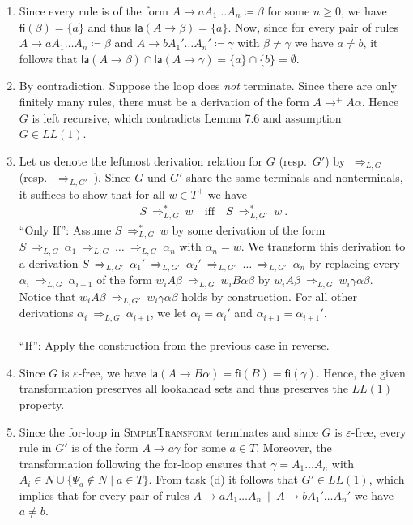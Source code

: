 \begin{solution}
	\begin{enumerate}
		\item Since every rule is of the form $A \rightarrow aA_1\ldots A_n \coloneqq \beta$ for some $n\geq 0$, we have $\textsf{fi}(\beta) = \{a\}$ and thus $\textsf{la}(A \rightarrow \beta) =\{a\}$. Now, since for every pair of rules $A \rightarrow a A_1 \dots A_n \coloneqq \beta$ and $A \rightarrow b A_1' \dots A_n' \coloneqq \gamma$ with $\beta \neq \gamma$ we have $a \neq b$, it follows that $\textsf{la}(A \rightarrow \beta) \cap \textsf{la}(A \rightarrow \gamma) = \{a\} \cap \{b\} = \emptyset$.
		\item By contradiction. Suppose the loop does \emph{not} terminate. Since there are only finitely many rules, there must be a derivation of the form $A \rightarrow^+ A\alpha$. Hence $G$ is left recursive, which contradicts Lemma 7.6 and assumption $G \in LL(1)$.
		\newcommand{\dg}{~{\Rightarrow_{L,G}}~}
		\newcommand{\dgp}{~{\Rightarrow_{L,G'}}~}
		\newcommand{\dgs}{~{\Rightarrow_{L,G}^*}~}
		\newcommand{\dgps}{~{\Rightarrow_{L,G'}^*}~}
		\item Let us denote the leftmost derivation relation for $G$ (resp.\ $G'$) by $\dg$ (resp.\ $\dgp$). Since $G$ und $G'$ share the same terminals and nonterminals, it suffices to show that for all $w \in  T^+$ we have
		\begin{align*}
		   S \dgs w \quad \text{iff} \quad S \dgps w~.
		\end{align*}
		\enquote{Only If}:
		Assume $S \dgs w$ by some derivation of the form $S \dg \alpha_1 \dg \ldots \dg \alpha_n$ with $\alpha_n = w$. We transform this derivation to a derivation $S \dgp \alpha_1' \dgp \alpha_2' \dgp \ldots \dgp \alpha_n$ by replacing every $\alpha_i \dg \alpha_{i+1}$ of the form $w_i A \beta \dg w_i B \alpha \beta$ by $w_i A \beta \dg w_i \gamma \alpha \beta$. Notice that $w_i A \beta \dgp w_i \gamma \alpha \beta$ holds by construction. For all other derivations $\alpha_i \dg \alpha_{i+1}$, we let $\alpha_i = \alpha_i'$ and $\alpha_{i+1} = \alpha_{i+1}'$. \\ \\
		\noindent
		\enquote{If}: Apply the construction from the previous case in reverse.
		\item Since $G$ is $\varepsilon$-free, we have $\textsf{la}(A \rightarrow B\alpha) = \textsf{fi}(B) = \textsf{fi}(\gamma)$. Hence, the given transformation preserves all lookahead sets and thus preserves the $LL(1)$ property.
		\item Since the for-loop in \textsc{SimpleTransform} terminates and since $G$ is $\varepsilon$-free, every rule in $G'$ is of the form $A \rightarrow a\gamma$ for some $a \in T$. Moreover, the transformation following the for-loop ensures that $\gamma = A_1\ldots A_n$ with $A_i \in N \cup \{ \Psi_a \not\in N \mid a \in T \}$. From task (d) it follows that $G' \in LL(1)$, which implies that for every pair of rules $A \rightarrow a A_1 \dots A_n ~\mid~A \rightarrow b A_1' \dots A_n'$ we have $a \neq b$.
	\end{enumerate}
\end{solution}

